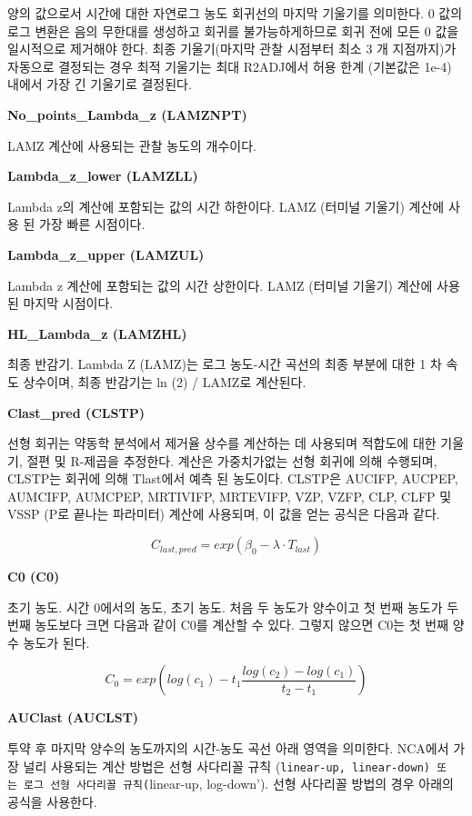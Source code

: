 \documentclass[
  11pt,
  krantz2, a4paper, twoside]{krantz}
\theoremstyle{definition}
\theoremstyle{definition}
\theoremstyle{definition}
\theoremstyle{definition}
\theoremstyle{remark}
\begin{document}
양의 값으로서 시간에 대한 자연로그 농도 회귀선의 마지막 기울기를 의미한다. 0 값의 로그 변환은 음의 무한대를 생성하고 회귀를 불가능하게하므로 회귀 전에 모든 0 값을 일시적으로 제거해야 한다. 최종 기울기(마지막 관찰 시점부터 최소 3 개 지점까지)가 자동으로 결정되는 경우 최적 기울기는 최대 R2ADJ에서 허용 한계 (기본값은 1e-4) 내에서 가장 긴 기울기로 결정된다.

\textbf{No\_points\_Lambda\_z (LAMZNPT)}

LAMZ 계산에 사용되는 관찰 농도의 개수이다.

\textbf{Lambda\_z\_lower (LAMZLL)}

Lambda z의 계산에 포함되는 값의 시간 하한이다. LAMZ (터미널 기울기) 계산에 사용 된 가장 빠른 시점이다.

\textbf{Lambda\_z\_upper (LAMZUL)}

Lambda z 계산에 포함되는 값의 시간 상한이다. LAMZ (터미널 기울기) 계산에 사용 된 마지막 시점이다.

\textbf{HL\_Lambda\_z (LAMZHL)}

최종 반감기. Lambda Z (LAMZ)는 로그 농도-시간 곡선의 최종 부분에 대한 1 차 속도 상수이며, 최종 반감기는 ln (2) / LAMZ로 계산된다.

\textbf{Clast\_pred (CLSTP)}

선형 회귀는 약동학 분석에서 제거율 상수를 계산하는 데 사용되며 적합도에 대한 기울기, 절편 및 R-제곱을 추정한다. 계산은 가중치가없는 선형 회귀에 의해 수행되며, CLSTP는 회귀에 의해 Tlast에서 예측 된 농도이다. CLSTP은 AUCIFP, AUCPEP, AUMCIFP, AUMCPEP, MRTIVIFP, MRTEVIFP, VZP, VZFP, CLP, CLFP 및 VSSP (P로 끝나는 파라미터) 계산에 사용되며, 이 값을 얻는 공식은 다음과 같다.

\[ C_ {last, pred} = exp(\beta_{0}-\lambda\cdot T_{last}) \]

\textbf{C0 (C0)}

초기 농도. 시간 0에서의 농도, 초기 농도. 처음 두 농도가 양수이고 첫 번째 농도가 두 번째 농도보다 크면 다음과 같이 C0를 계산할 수 있다. 그렇지 않으면 C0는 첫 번째 양수 농도가 된다.

\[ C_ {0} = exp (log (c_ {1})-t_ {1} \frac {log (c_ {2})-log (c_ {1})} {t_ {2}-t_ {1} }) \]

\textbf{AUClast (AUCLST)}

투약 후 마지막 양수의 농도까지의 시간-농도 곡선 아래 영역을 의미한다. NCA에서 가장 널리 사용되는 계산 방법은 선형 사다리꼴 규칙 (\texttt{linear-up,\ linear-down\textquotesingle{})\ 또는\ 로그\ 선형\ 사다리꼴\ 규칙(}linear-up, log-down'). 선형 사다리꼴 방법의 경우 아래의 공식을 사용한다.
\end{document}
